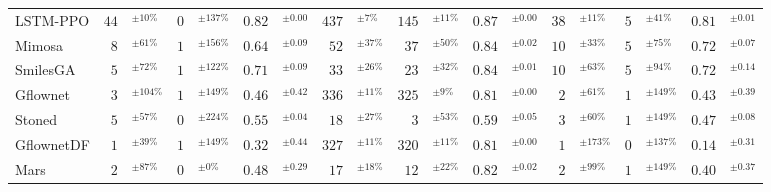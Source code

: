 \begin{tabular}{lr@{}lr@{}lr@{}lr@{}lr@{}lr@{}lr@{}lr@{}lr@{}l}
LSTM-PPO & $44$& $^{\pm10\%}$ & $0$& $^{\pm137\%}$ & $0.82$& $^{\pm0.00}$ & $437$& $^{\pm7\%}$ & $145$& $^{\pm11\%}$ & $0.87$& $^{\pm0.00}$ & $38$& $^{\pm11\%}$ & $5$& $^{\pm41\%}$ & $0.81$& $^{\pm0.01}$ \\
Mimosa & $8$& $^{\pm61\%}$ & $1$& $^{\pm156\%}$ & $0.64$& $^{\pm0.09}$ & $52$& $^{\pm37\%}$ & $37$& $^{\pm50\%}$ & $0.84$& $^{\pm0.02}$ & $10$& $^{\pm33\%}$ & $5$& $^{\pm75\%}$ & $0.72$& $^{\pm0.07}$ \\
SmilesGA & $5$& $^{\pm72\%}$ & $1$& $^{\pm122\%}$ & $0.71$& $^{\pm0.09}$ & $33$& $^{\pm26\%}$ & $23$& $^{\pm32\%}$ & $0.84$& $^{\pm0.01}$ & $10$& $^{\pm63\%}$ & $5$& $^{\pm94\%}$ & $0.72$& $^{\pm0.14}$ \\
Gflownet & $3$& $^{\pm104\%}$ & $1$& $^{\pm149\%}$ & $0.46$& $^{\pm0.42}$ & $336$& $^{\pm11\%}$ & $325$& $^{\pm9\%}$ & $0.81$& $^{\pm0.00}$ & $2$& $^{\pm61\%}$ & $1$& $^{\pm149\%}$ & $0.43$& $^{\pm0.39}$ \\
Stoned & $5$& $^{\pm57\%}$ & $0$& $^{\pm224\%}$ & $0.55$& $^{\pm0.04}$ & $18$& $^{\pm27\%}$ & $3$& $^{\pm53\%}$ & $0.59$& $^{\pm0.05}$ & $3$& $^{\pm60\%}$ & $1$& $^{\pm149\%}$ & $0.47$& $^{\pm0.08}$ \\
GflownetDF & $1$& $^{\pm39\%}$ & $1$& $^{\pm149\%}$ & $0.32$& $^{\pm0.44}$ & $327$& $^{\pm11\%}$ & $320$& $^{\pm11\%}$ & $0.81$& $^{\pm0.00}$ & $1$& $^{\pm173\%}$ & $0$& $^{\pm137\%}$ & $0.14$& $^{\pm0.31}$ \\
Mars & $2$& $^{\pm87\%}$ & $0$& $^{\pm0\%}$ & $0.48$& $^{\pm0.29}$ & $17$& $^{\pm18\%}$ & $12$& $^{\pm22\%}$ & $0.82$& $^{\pm0.02}$ & $2$& $^{\pm99\%}$ & $1$& $^{\pm149\%}$ & $0.40$& $^{\pm0.37}$ \\
\bottomrule
\end{tabular}